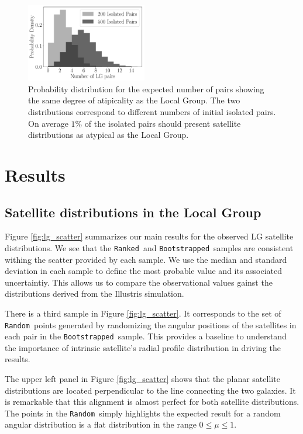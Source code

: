 \documentclass[a4paper,fleqn,usenatbib]{mnras}
\newcommand{\rank}{\texttt{Ranked}}
\newcommand{\boot}{\texttt{Bootstrapped}}
\newcommand{\rand}{\texttt{Random}}
\begin{document}
\begin{figure}
\centering
\includegraphics[width=0.47\textwidth]{expected_numbers.pdf}
\caption{Probability distribution for the expected number of pairs
  showing the same degree of atipicality as the Local Group. The two
  distributions correspond to different numbers of initial isolated
  pairs. On average $1\%$ of the isolated pairs should present
  satellite distributions as atypical as the Local Group.
\label{fig:expected_number}}
\end{figure}

\section{Results}
\label{sec:results}


\subsection{Satellite distributions in the Local Group}

Figure \ref{fig:lg_scatter} summarizes our main results for the
observed LG satellite distributions.
We see that the \rank\ and \boot\ samples are consistent 
withing the scatter provided by each sample.
We use the median and standard deviation in each sample to define the
most probable value and its associated uncertaintiy.
This allows us to compare the observational values gainst the
distributions derived from the Illustris simulation.

There is a third sample in Figure \ref{fig:lg_scatter}. 
It corresponds to the set of \rand\ points generated
by randomizing the angular positions of the satellites in each pair in
the \boot\ sample. 
This provides a baseline to understand the importance 
of intrinsic satellite's radial profile distribution in driving the
results.   

The upper left panel in Figure \ref{fig:lg_scatter} shows that the
planar satellite distributions are located perpendicular to the line
connecting the two galaxies. 
It is remarkable that this alignment is almost perfect for both
satellite distributions. 
The points in the \rand\ simply highlights the expected result for a
random angular distribution is a flat distribution in the range
$0\leq\mu\leq 1$.
\end{document}
